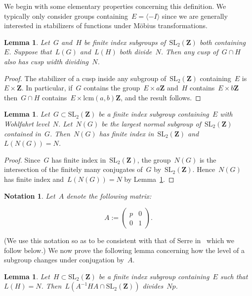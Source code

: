 \documentclass[10pt]{amsart}
\def\Z{\mathbf{Z}}
\newtheorem{lemma}[subsubsection]{Lemma}
\newtheorem{note}[subsubsection]{Notation}
\theoremstyle{remark}
\numberwithin{equation}{subsection}
\def\numequation{\addtocounter{subsubsection}{1}\begin{equation}}
\def\SL{\mathrm{SL}}
\begin{document}
We begin with some elementary properties concerning this definition.
We typically only consider groups containing~$E = \langle -I \rangle$ since we are  generally interested
in stabilizers of functions under M\"obius transformations.

\begin{lemma} \label{intersect}
Let~$G$ and~$H$ be finite index subgroups of~$\SL_2(\Z)$ both containing~$E$. Suppose that~$L(G)$ and~$L(H)$  both divide~$N$.  Then any cusp of~$G \cap H$ also has cusp width dividing~$N$.
\end{lemma}

\begin{proof}  The stabilizer of a cusp inside any subgroup of~$\SL_2(\Z)$ containing~$E$ is~$E \times  \Z$.
In particular, if~$G$ contains the group~$E \times a \Z$ and~$H$ contains~$E \times b \Z$ then~$G \cap H$ contains~$E \times \mathrm{lcm}(a,b) \Z$,
and the result follows.
\end{proof}

\begin{lemma} \label{normallevel}
Let~$G \subset \SL_2(\Z)$ be a finite index subgroup containing~$E$ with Wohlfahrt level~$N$.
Let~$N(G)$ be the largest normal subgroup of~$\SL_2(\Z)$ contained in~$G$.
Then~$N(G)$  has finite index in~$\SL_2(\Z)$ and~$L(N(G)) = N$.
\end{lemma}

\begin{proof}  Since~$G$ has finite index in~$\SL_2(\Z)$, the group~$N(G)$ is the intersection of the finitely many conjugates
of~$G$ by~$\SL_2(\Z)$. Hence~$N(G)$ has finite index and~$L(N(G))=N$ by Lemma~\ref{intersect}.
\end{proof}


\begin{note} Let~$A$ denote the following matrix:
\numequation
\label{defineA}
\displaystyle{A:=  \left( \begin{matrix} p & 0 \\ 0 & 1 \end{matrix} \right)}.
\end{equation}
\end{note}
(We use this notation so as to be consistent with
that of Serre in~\cite{SerreThompson} which we follow below.)
We now prove the following lemma concerning how the level of a subgroup changes under conjugation
by~$A$.


\begin{lemma}  \label{timesp} Let~$H \subset \SL_2(\Z)$  be a finite index subgroup containing~$E$ such that~$L(H) = N$.
Then~$L(A^{-1} H A \cap \SL_2(\Z))$ divides~$Np$.
\end{lemma}
\end{document}
